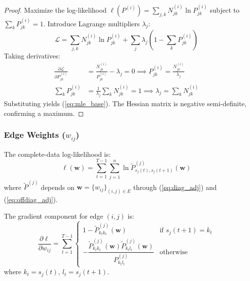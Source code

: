 \documentclass[answers,12pt,addpoints]{exam}
\begin{document}
\begin{proof}
Maximize the log-likelihood $\ell(P^{(i)}) = \sum_{j,k} N^{(i)}_{jk} \ln P^{(i)}_{jk}$ subject to $\sum_k P^{(i)}_{jk} = 1$. Introduce Lagrange multipliers $\lambda_j$:
\begin{equation}
    \mathscr{L} = \sum_{j,k} N^{(i)}_{jk} \ln P^{(i)}_{jk} + \sum_j \lambda_j \left(1 - \sum_k P^{(i)}_{jk}\right)
\end{equation}
Taking derivatives:
\begin{align}
    \frac{\partial \mathscr{L}}{\partial P^{(i)}_{jk}} &= \frac{N^{(i)}_{jk}}{P^{(i)}_{jk}} - \lambda_j = 0 \implies P^{(i)}_{jk} = \frac{N^{(i)}_{jk}}{\lambda_j} \\
    \sum_k P^{(i)}_{jk} &= \frac{1}{\lambda_j} \sum_k N^{(i)}_{jk} = 1 \implies \lambda_j = \sum_k N^{(i)}_{jk}
\end{align}
Substituting yields (\ref{eq:mle_base}). The Hessian matrix is negative semi-definite, confirming a maximum.
\end{proof}

\subsubsection{Edge Weights ($w_{ij}$)}
The complete-data log-likelihood is:
\begin{equation}
    \ell(\mathbf{w}) = \sum_{t=1}^{T-1} \sum_{j=1}^{n} \ln \widetilde{P}^{(j)}_{s_j(t), s_j(t+1)}(\mathbf{w}) \label{eq:full_ll}
\end{equation}
where $\widetilde{P}^{(j)}$ depends on $\mathbf{w} = \{w_{ij}\}_{(i,j)\in E}$ through (\ref{eq:diag_adj}) and (\ref{eq:offdiag_adj}).

\begin{theorem}
The gradient component for edge $(i,j)$ is:
\begin{equation}
    \frac{\partial \ell}{\partial w_{ij}} = \sum_{t=1}^{T-1} 
    \begin{cases} 
        1 - \widetilde{P}^{(j)}_{k_t k_t}(\mathbf{w}) & \text{if } s_j(t+1) = k_t \\
        -\dfrac{\widetilde{P}^{(j)}_{k_t k_t}(\mathbf{w}) \widetilde{P}^{(j)}_{k_t l_t}(\mathbf{w})}{P^{(j)}_{k_t l_t}} & \text{otherwise}
    \end{cases}
    \label{eq:gradient}
\end{equation}
where $k_t = s_j(t)$, $l_t = s_j(t+1)$.
\end{theorem}
\end{document}
